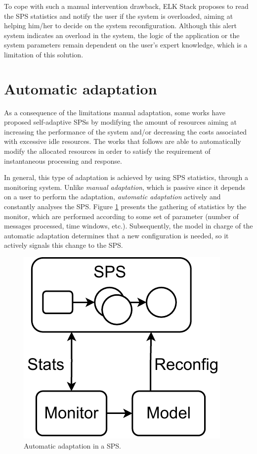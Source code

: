 To cope with such a manual intervention drawback, ELK Stack \cite{HasaniF18} proposes to read the SPS statistics and notify the user if the system is overloaded, aiming at helping him/her to decide on the system reconfiguration. Although this alert system indicates an overload in the system, the logic of the application or the system parameters remain dependent on the user's expert knowledge, which is a limitation of this solution.

\section{Automatic adaptation}
\label{rw-auto}
As a consequence of the limitations manual adaptation, some works have proposed self-adaptive SPSs \citep{KahveciG20, arkian2021model} by modifying the amount of resources aiming at increasing the performance of the system and/or decreasing the costs associated with excessive idle resources. The works that follows are able to automatically modify the allocated resources in order to satisfy the requirement of instantaneous processing and response.

In general, this type of adaptation is achieved by using SPS statistics, through a monitoring system. Unlike \textit{manual adaptation}, which is passive since it depends on a user to perform the adaptation, \textit{automatic adaptation} actively and constantly analyses the SPS. Figure \ref{fig:automatic-adaptation} presents the gathering of statistics by the monitor, which are performed according to some set of parameter (number of messages processed, time windows, etc.). Subsequently, the model in charge of the automatic adaptation determines that a new configuration is needed, so it actively signals this change to the SPS.

\begin{figure}[!ht]
	\centering
	\includegraphics[scale=0.85]{figures/concepts/RW-Automatic.pdf}
	\caption{Automatic adaptation in a SPS.}
	\label{fig:automatic-adaptation}
\end{figure}


